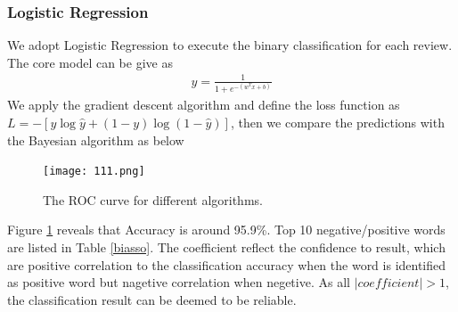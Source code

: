\documentclass[12pt]{article}%
\begin{document}
\subsubsection{Logistic Regression}
We adopt Logistic Regression to execute the binary classification for each review. The core model can be give as
\begin{gather}
y=\frac{1}{1+e^{-\left(w^{T} x+b\right)}}
\end{gather}
We apply the gradient descent algorithm and define the loss function as $L=-[y \log \hat{y}+(1-y) \log (1-\hat{y})]$, then we compare the predictions with the Bayesian algorithm \cite{bbb} as below

	\begin{figure}[H]
	\centering
	\texttt{[image: 111.png]}%
	\caption{The ROC curve for different algorithms.}\label{llll}%
\end{figure}

 Figure \ref{llll} reveals that Accuracy is around 95.9\%. Top 10 negative/positive words are listed in Table \ref{biasso}. The coefficient reflect the confidence to result, which are positive correlation to the classification accuracy when the word is identified as positive word but nagetive correlation when negetive. As all $ \left | coefficient \right |>1 $, the classification result can be deemed to be reliable.

\end{document}

